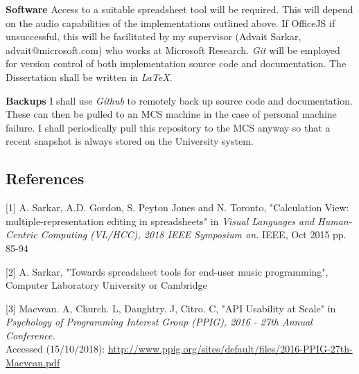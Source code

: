\documentclass[]{article}
\begin{document}
\textbf{Software} Access to a suitable spreadsheet tool will be
required. This will depend on the audio capabilities of the
implementations outlined above. If OfficeJS if unsuccessful, this will
be facilitated by my supervisor (Advait Sarkar, advait@microsoft.com)
who works at Microsoft Research. \emph{Git} will be employed for version
control of both implementation source code and documentation. The
Dissertation shall be written in \emph{LaTeX}.

\textbf{Backups} I shall use \emph{Github} to remotely back up source
code and documentation. These can then be pulled to an MCS machine in
the case of personal machine failure. I shall periodically pull this
repository to the MCS anyway so that a recent snapshot is always stored
on the University system.

\subsection{References}\label{header-n133}

{[}1{]} A. Sarkar, A.D. Gordon, S. Peyton Jones and N. Toronto,
"Calculation View: multiple-representation editing in spreadsheets" in
\emph{Visual Languages and Human-Centric Computing (VL/HCC), 2018 IEEE
Symposium on.} IEEE, Oct 2015 pp. 85-94

{[}2{]} A. Sarkar, "Towards spreadsheet tools for end-user music
programming", Computer Laboratory University or Cambridge

{[}3{]} Macvean. A, Church. L, Daughtry. J, Citro. C, "API Usability at
Scale" in \emph{Psychology of Programming Interest Group (PPIG), 2016 -
27th Annual Conference.}\\Accessed
(15/10/2018):
\url{http://www.ppig.org/sites/default/files/2016-PPIG-27th-Macvean.pdf}
\end{document}
